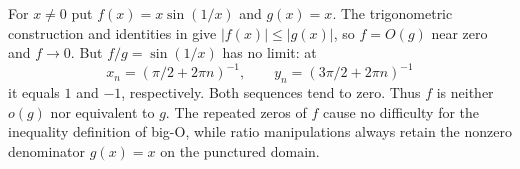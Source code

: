 \begin{example}
For $x\ne0$ put $f(x)=x\sin(1/x)$ and $g(x)=x$. The trigonometric construction and identities in  give $|f(x)|\le|g(x)|$, so $f=O(g)$ near zero and $f\to0$. But $f/g=\sin(1/x)$ has no limit: at
\[ x_n=(\pi/2+2\pi n)^{-1},\qquad y_n=(3\pi/2+2\pi n)^{-1} \]
it equals $1$ and $-1$, respectively. Both sequences tend to zero. Thus $f$ is neither $o(g)$ nor equivalent to $g$. The repeated zeros of $f$ cause no difficulty for the inequality definition of big-O, while ratio manipulations always retain the nonzero denominator $g(x)=x$ on the punctured domain.
\end{example}
